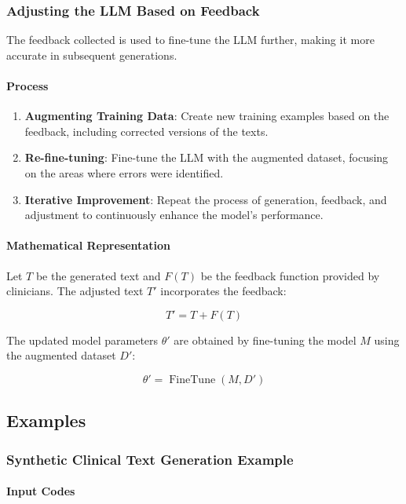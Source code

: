 \documentclass[12pt, a4paper]{article}
\begin{document}
\subsubsection{Adjusting the LLM Based on Feedback}

The feedback collected is used to fine-tune the LLM further, making it more accurate in subsequent generations.

\paragraph{Process}

\begin{enumerate}
    \item \textbf{Augmenting Training Data}: Create new training examples based on the feedback, including corrected versions of the texts.
    \item \textbf{Re-fine-tuning}: Fine-tune the LLM with the augmented dataset, focusing on the areas where errors were identified.
    \item \textbf{Iterative Improvement}: Repeat the process of generation, feedback, and adjustment to continuously enhance the model's performance.
\end{enumerate}

\paragraph{Mathematical Representation}

Let \( T \) be the generated text and \( F(T) \) be the feedback function provided by clinicians. The adjusted text \( T' \) incorporates the feedback:

\[
T' = T + F(T)
\]

The updated model parameters \( \theta' \) are obtained by fine-tuning the model \( M \) using the augmented dataset \( D' \):

\[
\theta' = \operatorname{FineTune}(M, D')
\]

\subsection{Examples}

\subsubsection{Synthetic Clinical Text Generation Example}

\paragraph{Input Codes}
\end{document}
